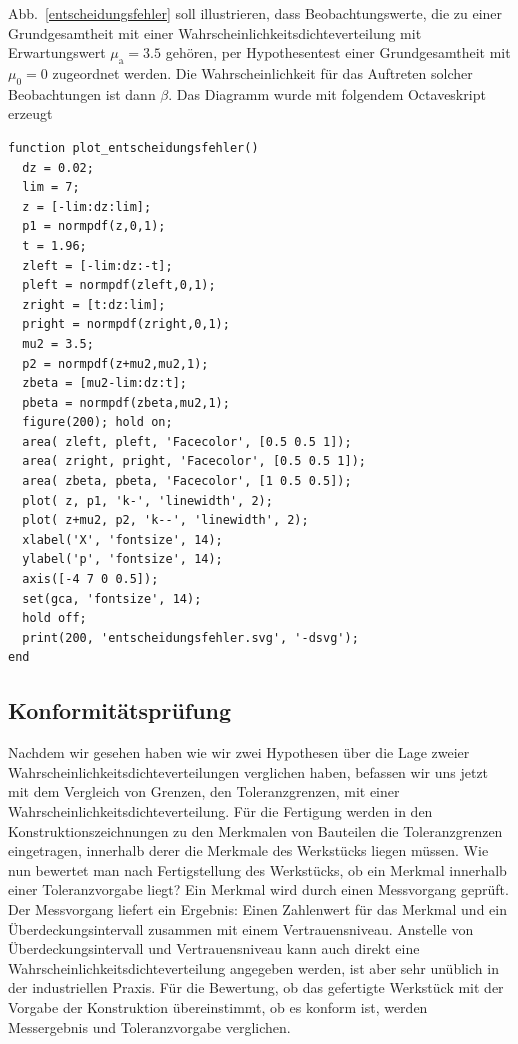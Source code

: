 Abb.~\ref{entscheidungsfehler} soll illustrieren, dass Beobachtungswerte, die zu einer
Grundgesamtheit mit einer Wahrscheinlichkeitsdichteverteilung mit Erwartungswert
$\mu_\mathrm{a} = 3.5$ gehören, per Hypothesentest einer Grundgesamtheit mit $\mu_0 = 0$
zugeordnet werden. Die Wahrscheinlichkeit für das Auftreten solcher Beobachtungen ist
dann $\beta$. Das Diagramm wurde mit folgendem Octaveskript erzeugt

\begin{lstlisting}[style=Matlab]
function plot_entscheidungsfehler()
  dz = 0.02;
  lim = 7;
  z = [-lim:dz:lim];
  p1 = normpdf(z,0,1);
  t = 1.96;
  zleft = [-lim:dz:-t];
  pleft = normpdf(zleft,0,1);
  zright = [t:dz:lim];
  pright = normpdf(zright,0,1);
  mu2 = 3.5;
  p2 = normpdf(z+mu2,mu2,1);
  zbeta = [mu2-lim:dz:t];
  pbeta = normpdf(zbeta,mu2,1);
  figure(200); hold on;
  area( zleft, pleft, 'Facecolor', [0.5 0.5 1]);
  area( zright, pright, 'Facecolor', [0.5 0.5 1]);
  area( zbeta, pbeta, 'Facecolor', [1 0.5 0.5]);
  plot( z, p1, 'k-', 'linewidth', 2);
  plot( z+mu2, p2, 'k--', 'linewidth', 2);
  xlabel('X', 'fontsize', 14);
  ylabel('p', 'fontsize', 14);
  axis([-4 7 0 0.5]);
  set(gca, 'fontsize', 14);
  hold off;
  print(200, 'entscheidungsfehler.svg', '-dsvg');
end
\end{lstlisting}


\subsection{Konformitätsprüfung}
Nachdem wir gesehen haben wie wir zwei Hypothesen über die Lage zweier Wahrscheinlich\-keits\-dichte\-ver\-teilungen
verglichen haben, befassen wir uns jetzt mit dem Vergleich von Grenzen, den Toleranzgrenzen, mit einer
Wahrscheinlichkeitsdichteverteilung. Für die Fertigung werden in den Konstruktionszeichnungen zu den Merkmalen
von Bauteilen die Toleranzgrenzen eingetragen, innerhalb derer die Merkmale des Werkstücks liegen müssen. Wie nun
bewertet man nach Fertigstellung des Werkstücks, ob ein Merkmal innerhalb einer Toleranzvorgabe liegt? Ein Merkmal
wird durch einen Messvorgang geprüft. Der Messvorgang liefert ein Ergebnis: Einen Zahlenwert für das Merkmal und
ein Überdeckungsintervall zusammen mit einem Vertrauensniveau. Anstelle von Überdeckungsintervall und Vertrauensniveau
kann auch direkt eine Wahrscheinlichkeitsdichteverteilung angegeben werden, ist aber sehr unüblich in der industriellen
Praxis. Für die Bewertung, ob das gefertigte Werkstück mit der Vorgabe der Konstruktion übereinstimmt, ob es konform ist,
werden Messergebnis und Toleranzvorgabe verglichen.

